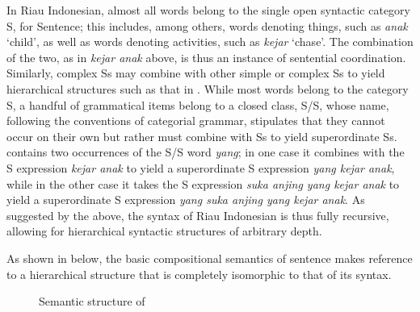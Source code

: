 \documentclass[output=paper]{langscibook}
\begin{document}
In Riau Indonesian, almost all words belong to the single open syntactic category S, for Sentence; this includes, among others, words denoting things, such as \textit{anak} `child', as well as words denoting activities, such as \textit{kejar} `chase'. The combination of the two, as in \textit{kejar anak} above, is thus an instance of sentential coordination. Similarly, complex Ss may combine with other simple or complex Ss to yield hierarchical structures such as that in . While most words belong to the category S, a handful of grammatical items belong to a closed class, S/S, whose name, following the conventions of categorial grammar, stipulates that they cannot occur on their own but rather must combine with Ss to yield superordinate Ss.  contains two occurrences of the S/S word \textit{yang}; in one case it combines with the S expression \textit{kejar anak} to yield a superordinate S expression \textit{yang kejar anak}, while in the other case it takes the S expression \textit{suka anjing yang kejar anak} to yield a superordinate S expression \textit{yang suka anjing yang kejar anak}. As suggested by the above, the syntax of Riau Indonesian is thus fully recursive, allowing for hierarchical syntactic structures of arbitrary depth.

As shown in  below, the basic compositional semantics of sentence  makes reference to a hierarchical structure that is completely isomorphic to that of its syntax.

\begin{figure}
\caption{\label{fig:gil:fig2}Semantic structure of }
\end{figure}
\end{document}
